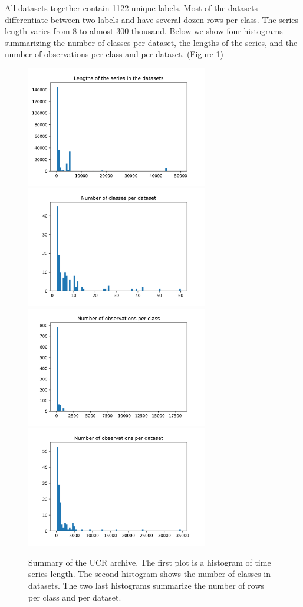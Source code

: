\documentclass[a4paper,11pt,twoside]{report}
\theoremstyle{definition}
\begin{document}
All datasets together contain 1122 unique labels. Most of the datasets differentiate between two labels and have several dozen rows per class. The series length varies from 8 to almost 300 thousand. Below we show four histograms summarizing the number of classes per dataset, the lengths of the series, and the number of observations per class and per dataset. (Figure \ref{fig:histograms})
\begin{figure}[h!]
\centering
\includegraphics[width=7.9cm]{imgs/lengths_of_the_series_in_the_datasets.png}
\includegraphics[width=7.9cm]{imgs/number_of_classes_per_dataset.png}
\includegraphics[width=7.9cm]{imgs/number_of_observations_per_class.png}
\includegraphics[width=7.9cm]{imgs/number_of_observations_per_dataset.png}
\caption{Summary of the UCR archive. The first plot is a histogram of time series length. The second histogram shows the number of classes in datasets. The two last histograms summarize the number of rows per class and per dataset.}
\label{fig:histograms}
\end{figure}
\end{document}

